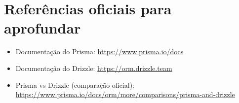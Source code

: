 \section{Referências oficiais para aprofundar}

\begin{itemize}[leftmargin=*, itemsep=0.3em]
  \item Documentação do Prisma: \url{https://www.prisma.io/docs}
  \item Documentação do Drizzle: \url{https://orm.drizzle.team}
  \item Prisma vs Drizzle (comparação oficial): \url{https://www.prisma.io/docs/orm/more/comparisons/prisma-and-drizzle}
\end{itemize}
